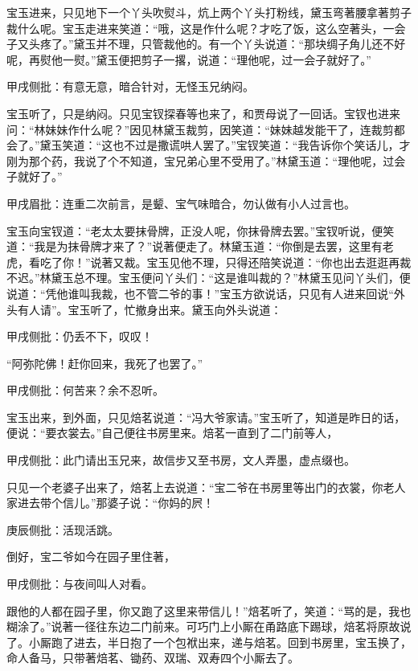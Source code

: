 \begin{parag}
    宝玉进来，只见地下一个丫头吹熨斗，炕上两个丫头打粉线，黛玉弯著腰拿著剪子裁什么呢。宝玉走进来笑道：“哦，这是作什么呢？才吃了饭，这么空著头，一会子又头疼了。”黛玉并不理，只管裁他的。有一个丫头说道：“那块绸子角儿还不好呢，再熨他一熨。”黛玉便把剪子一撂，说道：“理他呢，过一会子就好了。”\begin{note}甲戌侧批：有意无意，暗合针对，无怪玉兄纳闷。\end{note}宝玉听了，只是纳闷。只见宝钗探春等也来了，和贾母说了一回话。宝钗也进来问：“林妹妹作什么呢？”因见林黛玉裁剪，因笑道：“妹妹越发能干了，连裁剪都会了。”黛玉笑道：“这也不过是撒谎哄人罢了。”宝钗笑道：“我告诉你个笑话儿，才刚为那个药，我说了个不知道，宝兄弟心里不受用了。”林黛玉道：“理他呢，过会子就好了。”\begin{note}甲戌眉批：连重二次前言，是颦、宝气味暗合，勿认做有小人过言也。\end{note}宝玉向宝钗道：“老太太要抹骨牌，正没人呢，你抹骨牌去罢。”宝钗听说，便笑道：“我是为抹骨牌才来了？”说著便走了。林黛玉道：“你倒是去罢，这里有老虎，看吃了你！”说著又裁。宝玉见他不理，只得还陪笑说道：“你也出去逛逛再裁不迟。”林黛玉总不理。宝玉便问丫头们：“这是谁叫裁的？”林黛玉见问丫头们，便说道：“凭他谁叫我裁，也不管二爷的事！”宝玉方欲说话，只见有人进来回说“外头有人请”。宝玉听了，忙撤身出来。黛玉向外头说道：\begin{note}甲戌侧批：仍丢不下，叹叹！\end{note}“阿弥陀佛！赶你回来，我死了也罢了。”\begin{note}甲戌侧批：何苦来？余不忍听。\end{note}
\end{parag}


\begin{parag}
    宝玉出来，到外面，只见焙茗说道：“冯大爷家请。”宝玉听了，知道是昨日的话，便说：“要衣裳去。”自己便往书房里来。焙茗一直到了二门前等人，\begin{note}甲戌侧批：此门请出玉兄来，故信步又至书房，文人弄墨，虚点缀也。\end{note}只见一个老婆子出来了，焙茗上去说道：“宝二爷在书房里等出门的衣裳，你老人家进去带个信儿。”那婆子说：“你妈的屄！\begin{note}庚辰侧批：活现活跳。\end{note}倒好，宝二爷如今在园子里住著，\begin{note}甲戌侧批：与夜间叫人对看。\end{note}跟他的人都在园子里，你又跑了这里来带信儿！”焙茗听了，笑道：“骂的是，我也糊涂了。”说著一径往东边二门前来。可巧门上小厮在甬路底下踢球，焙茗将原故说了。小厮跑了进去，半日抱了一个包袱出来，递与焙茗。回到书房里，宝玉换了，命人备马，只带著焙茗、锄药、双瑞、双寿四个小厮去了。
\end{parag}


